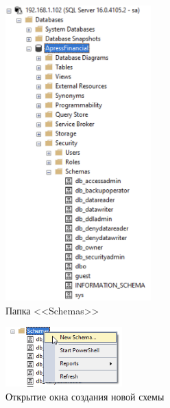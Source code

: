 \documentclass[a4paper, 14pt]{extarticle}
\begin{document}
\begin{figure}[H]
  \centering
  \includegraphics[width=0.5\textwidth]{images/task-5/step-1.png}
  \caption{Папка <<Schemas>>}
  \label{fig:task-5/step-1.png}
\end{figure}

\begin{figure}[H]
  \centering
  \includegraphics[width=0.4\textwidth]{images/task-5/step-2.png}
  \caption{Открытие окна создания новой схемы}
  \label{fig:task-5/step-2.png}
\end{figure}
\end{document}
